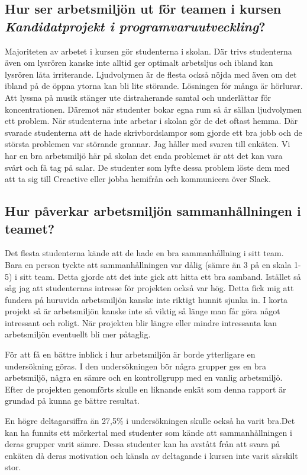 \subsection{Hur ser arbetsmiljön ut för teamen i kursen \textit{Kandidatprojekt i programvaruutveckling}?}
Majoriteten av arbetet i kursen gör studenterna i skolan. Där trivs studenterna även om lysrören kanske inte alltid ger optimalt arbetsljus och ibland kan lysrören låta irriterande. Ljudvolymen är de flesta också nöjda med även om det ibland på de öppna ytorna kan bli lite störande. Lösningen för många är hörlurar. Att lyssna på musik stänger ute distraherande samtal och underlättar för koncentrationen. Däremot när studenter bokar egna rum så är sällan ljudvolymen ett problem. När studenterna inte arbetar i skolan gör de det oftast hemma. Där svarade studenterna att de hade skrivbordslampor som gjorde ett bra jobb och de största problemen var störande grannar. Jag håller med svaren till enkäten. Vi har en bra arbetsmiljö här på skolan det enda problemet är att det kan vara svårt och få tag på salar. De studenter som lyfte dessa problem löste dem med att ta sig till Creactive eller jobba hemifrån och kommunicera över Slack.

\subsection{Hur påverkar arbetsmiljön sammanhållningen i teamet?}
Det flesta studenterna kände att de hade en bra sammanhållning i sitt team. Bara en person tyckte att sammanhållningen var dålig (sämre än 3 på en skala 1-5) i sitt team. Detta gjorde att det inte gick att hitta ett bra samband. Istället så såg jag att studenternas intresse för projekten också var hög. Detta fick mig att fundera på huruvida arbetsmiljön kanske inte riktigt hunnit sjunka in. I korta projekt så är arbetsmiljön kanske inte så viktig så länge man får göra något intressant och roligt. När projekten blir längre eller mindre intressanta kan arbetsmiljön eventuellt bli mer påtaglig.

För att få en bättre inblick i hur arbetsmiljön är borde ytterligare en undersökning göras. I den undersökningen bör några grupper ges en bra arbetsmiljö, några en sämre och en kontrollgrupp med en vanlig arbetsmiljö. Efter de projekten genomförts skulle en liknande enkät som denna rapport är grundad på kunna ge bättre resultat. 

En högre deltagarsiffra än 27,5\% i undersökningen skulle också ha varit bra.Det kan ha funnits ett mörkertal med studenter som kände att sammanhållningen i deras grupper varit sämre. Dessa studenter kan ha avstått från att svara på enkäten då deras motivation och känsla av deltagande i kursen inte varit särskilt stor.

